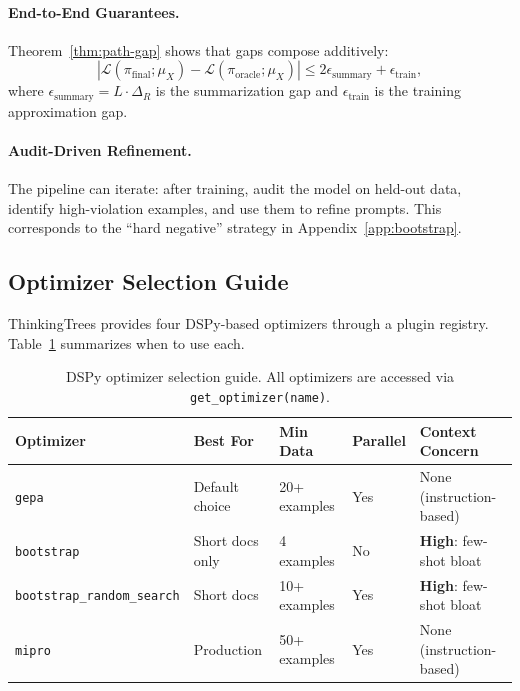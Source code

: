 \paragraph{End-to-End Guarantees.}
Theorem~\ref{thm:path-gap} shows that gaps compose additively:
\[
|\mathcal{L}(\pi_{\text{final}}; \mu_X) - \mathcal{L}(\pi_{\text{oracle}}; \mu_X)| \le 2\epsilon_{\text{summary}} + \epsilon_{\text{train}},
\]
where $\epsilon_{\text{summary}} = L \cdot \Delta_R$ is the summarization gap and $\epsilon_{\text{train}}$ is the training approximation gap.

\paragraph{Audit-Driven Refinement.}
The pipeline can iterate: after training, audit the model on held-out data, identify high-violation examples, and use them to refine prompts. This corresponds to the ``hard negative'' strategy in Appendix~\ref{app:bootstrap}.


\subsection{Optimizer Selection Guide}\label{sec:optimizer-guide}

ThinkingTrees provides four DSPy-based optimizers through a plugin registry. Table~\ref{tab:optimizer-selection} summarizes when to use each.

\begin{table}[h]
\centering
\caption{DSPy optimizer selection guide. All optimizers are accessed via \texttt{get\_optimizer(name)}.}
\label{tab:optimizer-selection}
\small
\begin{tabular}{@{}llllp{4cm}@{}}
\toprule
\textbf{Optimizer} & \textbf{Best For} & \textbf{Min Data} & \textbf{Parallel} & \textbf{Context Concern} \\
\midrule
\texttt{gepa} & Default choice & 20+ examples & Yes & None (instruction-based) \\
\texttt{bootstrap} & Short docs only & 4 examples & No & \textbf{High}: few-shot bloat \\
\texttt{bootstrap\_random\_search} & Short docs & 10+ examples & Yes & \textbf{High}: few-shot bloat \\
\texttt{mipro} & Production & 50+ examples & Yes & None (instruction-based) \\
\bottomrule
\end{tabular}
\end{table}

